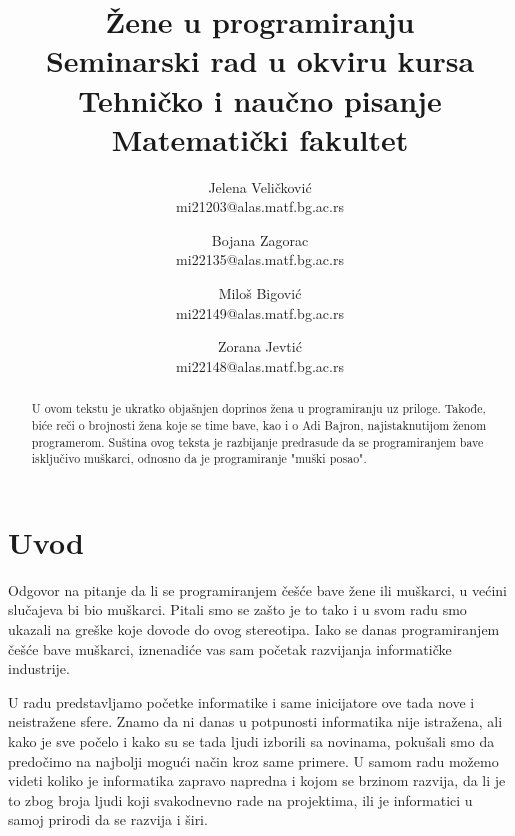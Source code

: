 \documentclass[a4paper,12pt]{article}
\begin{document}
\title{\textbf{Žene u programiranju\\} \small{Seminarski rad u okviru kursa\\Tehničko i naučno pisanje\\ Matematički fakultet}}

\author{Jelena Veličković\\ mi21203@alas.matf.bg.ac.rs \and Bojana Zagorac\\ mi22135@alas.matf.bg.ac.rs \and Miloš Bigović\\ mi22149@alas.matf.bg.ac.rs \and Zorana Jevtić\\ mi22148@alas.matf.bg.ac.rs}

\date{\textit{}}

\maketitle

\begin{abstract}
    U ovom tekstu je ukratko objašnjen doprinos žena u programiranju uz priloge. Takođe, biće reči o
    brojnosti žena koje se time bave, kao i o Adi Bajron, najistaknutijom ženom programerom. Suština 
    ovog teksta je razbijanje predrasude da se programiranjem bave isključivo muškarci, odnosno da je 
    programiranje "muški posao". 
\end{abstract}


\color{blue}\tableofcontents

\newpage
\color{black}\section{Uvod}
\begin{flushleft}
Odgovor na pitanje da li se programiranjem češće bave žene ili muškarci, u većini slučajeva bi bio muškarci. Pitali smo se zašto je to tako i u svom radu smo ukazali na greške koje dovode do ovog stereotipa. 
Iako se danas programiranjem češće bave muškarci, iznenadiće vas sam početak razvijanja informatičke industrije. 

U radu predstavljamo početke informatike i same inicijatore ove tada nove i neistražene sfere. Znamo da ni danas u potpunosti informatika nije istražena, ali kako je sve počelo i kako su se tada ljudi izborili sa novinama, pokušali smo da predočimo na najbolji mogući način kroz same primere. U samom radu možemo videti koliko je informatika zapravo napredna i kojom se brzinom razvija, da li je to zbog broja ljudi koji svakodnevno rade na projektima, ili je informatici u samoj prirodi da se razvija i širi.
\end{flushleft}
\end{document}
